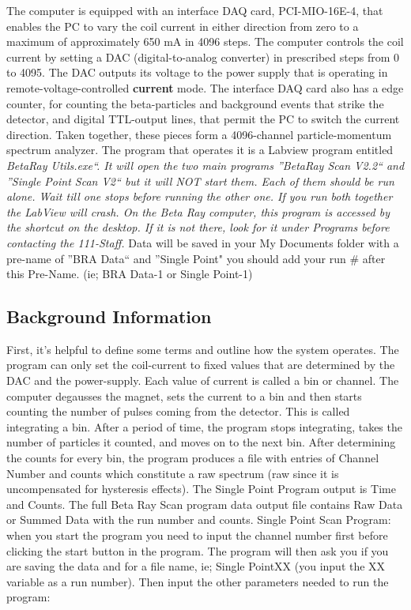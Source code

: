 \documentclass{../lab}
\begin{document}
The computer is equipped with an interface DAQ card, PCI-MIO-16E-4, that enables the PC to vary the coil current in either direction from zero to a maximum of approximately 650 mA in 4096 steps. The computer controls the coil current by setting a DAC (digital-to-analog converter) in prescribed steps from 0 to 4095. The DAC outputs its voltage to the power supply that is operating in remote-voltage-controlled \textbf{current} mode. The interface DAQ card also has a edge counter, for counting the beta-particles and background events that strike the detector, and digital TTL-output lines, that permit the PC to switch the current direction. Taken together, these pieces form a 4096-channel particle-momentum spectrum analyzer. The program that operates it is a Labview program entitled \emph{BetaRay Utils.exe``. It will open the two main programs ''BetaRay Scan V2.2`` and ''Single Point Scan V2`` but it will NOT start them. Each of them should be run alone. Wait till one stops before running the other one. If you run both together the LabView will crash. On the Beta Ray computer, this program is accessed by the shortcut on the desktop. If it is not there, look for it under Programs before contacting the 111-Staff.} Data will be saved in your My Documents folder with a pre-name of ''BRA Data`` and ''Single Point" you should add your run \# after this Pre-Name. (ie; BRA Data-1 or Single Point-1)

\subsection{Background Information}

First, it's helpful to define some terms and outline how the system operates. The program can only set the coil-current to fixed values that are determined by the DAC and the power-supply. Each value of current is called a bin or channel. The computer degausses the magnet, sets the current to a bin and then starts counting the number of pulses coming from the detector. This is called integrating a bin. After a period of time, the program stops integrating, takes the number of particles it counted, and moves on to the next bin. After determining the counts for every bin, the program produces a file with entries of Channel Number and counts which constitute a raw spectrum (raw since it is uncompensated for hysteresis effects). The Single Point Program output is Time and Counts. The full Beta Ray Scan program data output file contains Raw Data or Summed Data with the run number and counts. Single Point Scan Program: when you start the program you need to input the channel number first before clicking the start button in the program. The program will then ask you if you are saving the data and for a file name, ie; Single PointXX (you input the XX variable as a run number). Then input the other parameters needed to run the program:
\end{document}
